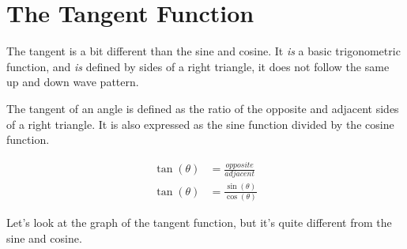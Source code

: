 \clearpage
\section{The Tangent Function}
The tangent is a bit different than the sine and cosine. It \textit{is} a basic trigonometric function, and \textit{is} defined by sides of a right triangle, it does not follow the same up and down wave pattern.

The tangent of an angle is defined as the ratio of the opposite and adjacent sides of a right triangle. It is also expressed as the sine function divided by the cosine function.
\begin{center}
    \begin{minipage}[c]{0.4\linewidth}
        \centering
    \end{minipage}%
    \begin{minipage}[c]{0.3\linewidth}
        \begin{align*}
            \tan(\theta) &= \frac{opposite}{adjacent} \\
            \tan(\theta) &= \frac{\sin(\theta)}{\cos(\theta)}
        \end{align*}
    \end{minipage}
\end{center}
Let's look at the graph of the tangent function, but it's quite different from the sine and cosine.
